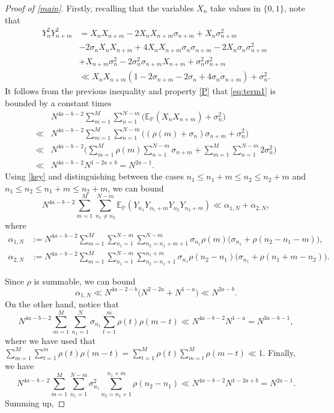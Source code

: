 \documentclass[11pt]{amsart}
\numberwithin{equation}{section}
\theoremstyle{definition}
\theoremstyle{plain}
\renewcommand{\P}{{\mathbb P}}
\begin{document}
\begin{proof}[Proof of \cref{main}]
Firstly, recalling that the variables $X_n$ take values in $\{0,1\}$, note that 
 \begin{align*}
     Y_n^2Y_{n+m}^2&=X_{n}X_{n+m}-2X_nX_{n+m}\sigma_{n+m}+X_n\sigma_{n+m}^2\\
     &-2\sigma_nX_nX_{n+m}+4X_nX_{n+m}\sigma_n\sigma_{n+m}-2X_n\sigma_n\sigma_{n+m}^2\\
     &+X_{n+m}\sigma_n^2-2\sigma_{n}^2\sigma_{n+m}X_{n+m}+\sigma_{n}^2\sigma_{n+m}^2\\
     &\ll X_nX_{n+m}(1-2\sigma_{n+m}-2\sigma_n+4\sigma_{n}\sigma_{n+m})+\sigma_n^2.
 \end{align*}
It follows from the previous inequality and  property \eqref{P} that \eqref{eq:term1} is bounded by a constant times 
\begin{align*}
    &N^{4a-b-2}\sum_{m=1}^M \sum_{n=1}^{N-m} \Big(\mathbb{E}_{\mathbb{P}}(X_nX_{n+m})+\sigma_n^2\Big)\\
    \ll & N^{4a-b-2}\sum_{m=1}^M \sum_{n=1}^{N-m}\Big((\rho(m)+\sigma_n)\sigma_{n+m}+\sigma_n^2\Big)\\
    \ll & N^{4a-b-2}\Big(\sum_{m=1}^M \rho(m)\sum_{n=1}^{N-m}\sigma_{n+m}+\sum_{m=1}^M\sum_{n=1}^{N-m}2\sigma_n^2 \Big)\\ 
    \ll&   N^{4a-b-2} N^{1-2a+b}= N^{2a-1}. 
\end{align*}
Using \cref{key} and distinguishing between the cases $n_1\leq n_1+m\leq n_2\leq n_2+m$ and $n_1\leq n_2\leq n_1+m\leq n_2+m$, we can bound
\[N^{4a-b-2}\sum_{m=1}^M \sum_{n_1\neq n_2}^{N-m} \mathbb{E}_{\P}(Y_{n_1}Y_{n_1+m}Y_{n_2}Y_{n_2+m})\ll \alpha_{1,N}+\alpha_{2,N},\] where
\begin{align*}
\alpha_{1,N}&:=N^{4a-b-2} \sum_{m=1}^M \sum_{n_1=1}^{N-m}\sum_{n_2=n_1+m+1}^{N-m}\sigma_{n_1}\rho(m)\Big(\sigma_{n_1}+\rho(n_2-n_1-m)\Big),\\
\alpha_{2,N}&:=N^{4a-b-2} \sum_{m=1}^M\sum_{n_1=1}^{N-m}\sum_{n_2=n_1+1}^{n_1+m}\sigma_{n_1}\rho(n_2-n_1)\Big(\sigma_{n_1}+\rho(n_1+m-n_2)\Big).
\end{align*}


Since $\rho$ is summable, we can bound
\[ \alpha_{1,N} \ll N^{4a-2-b}\Big(N^{2-2a}+N^{1-a}\Big)\ll N^{2a-b}.\]
On the other hand, notice that 
 \[N^{4a-b-2} \sum_{m=1}^M\sum_{n_1=1}^{N} \sigma_{n_1} \sum_{t=1}^{m} \rho(t)\rho(m-t)  \ll N^{4a-b-2} N^{1-a} = N^{3a-b-1},\]
 where we have used that $\sum_{m=1}^M \sum_{t=1}^{m} \rho(t)\rho(m-t)=\sum_{t=1}^M\rho(t)\sum_{m=t}^M \rho(m-t)\ll 1$.
 Finally, we have
\[ N^{4a-b-2} \sum_{m=1}^M\sum_{n_1=1}^{N-m}\sigma_{n_1}^2\sum_{n_2=n_1+1}^{n_1+m} \rho(n_2-n_1)\ll N^{4a-b-2}N^{1-2a+b}=N^{2a-1}.\]
Summing up, 


\end{proof}
\end{document}
